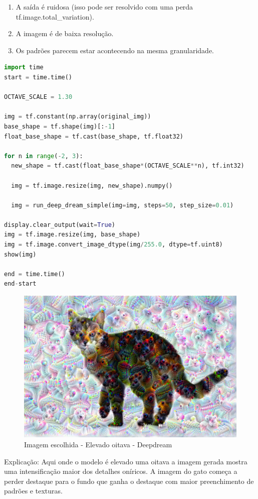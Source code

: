 \begin{enumerate}
    \item A saída é ruidosa (isso pode ser resolvido com uma perda tf.image.total\_variation).
    \item A imagem é de baixa resolução.
    \item Os padrões parecem estar acontecendo na mesma granularidade.
\end{enumerate}
\begin{lstlisting}[language=Python, style=input]
import time
start = time.time()

OCTAVE_SCALE = 1.30

img = tf.constant(np.array(original_img))
base_shape = tf.shape(img)[:-1]
float_base_shape = tf.cast(base_shape, tf.float32)

for n in range(-2, 3):
  new_shape = tf.cast(float_base_shape*(OCTAVE_SCALE**n), tf.int32)

  img = tf.image.resize(img, new_shape).numpy()

  img = run_deep_dream_simple(img=img, steps=50, step_size=0.01)

display.clear_output(wait=True)
img = tf.image.resize(img, base_shape)
img = tf.image.convert_image_dtype(img/255.0, dtype=tf.uint8)
show(img)

end = time.time()
end-start
\end{lstlisting}
\begin{figure}[H]
\centering
\includegraphics[width=.8\linewidth]{apendices/fig/13_IAA012_13.png}
\caption{Imagem escolhida - Elevado oitava - Deepdream}
\end{figure}
Explicação: Aqui onde o modelo é elevado uma oitava a imagem gerada mostra uma intensificação maior dos detalhes oníricos. A imagem do gato começa a perder destaque para o fundo que ganha o destaque com maior preenchimento de padrões e texturas.


